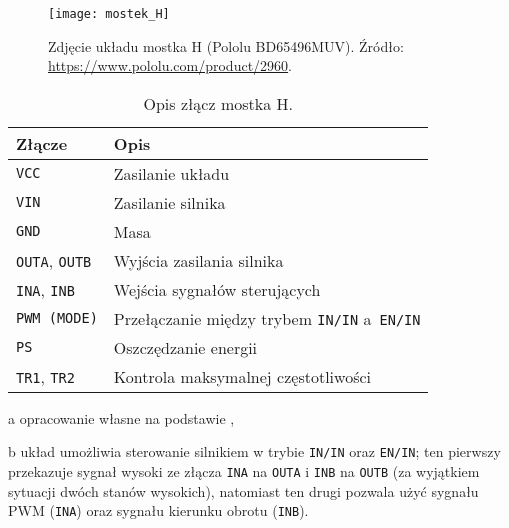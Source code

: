 \begin{figure}[H]
    \centering
    \texttt{[image: mostek\_H]}
    \caption{Zdjęcie układu mostka H (Pololu BD65496MUV). Źródło: \url{https://www.pololu.com/product/2960}.}
    \label{fig:zdjecie_mostka_H}
\end{figure}

\begin{table}[h]
    \centering
    \begin{threeparttable}
        \caption{Opis złącz mostka H.}
        \label{tab:zlacza_mostka_H}
        
        \begin{tabularx}{0.67\textwidth}{l | l}
            \toprule
            Złącze & Opis \\
            \midrule
            \texttt{VCC} & Zasilanie układu \\
            \texttt{VIN} & Zasilanie silnika \\
            \texttt{GND} & Masa \\
            \texttt{OUTA}, \texttt{OUTB} & Wyjścia zasilania silnika \\
            \texttt{INA}, \texttt{INB} & Wejścia sygnałów sterujących \\
            \texttt{PWM (MODE)} & Przełączanie między trybem \texttt{IN/IN} a~\texttt{EN/IN}\tnote{b} \\
            \texttt{PS} & Oszczędzanie energii \\
            \texttt{TR1}, \texttt{TR2} & Kontrola maksymalnej częstotliwości \\
            \bottomrule
        \end{tabularx}
        
        \begin{tablenotes}
            \footnotesize
            \item[a] opracowanie własne na podstawie \cite{MOSTEK_H_MANUAL},
            \item[b] układ umożliwia sterowanie silnikiem w trybie \texttt{IN/IN} oraz \texttt{EN/IN}; ten pierwszy przekazuje sygnał wysoki ze złącza \texttt{INA} na \texttt{OUTA} i \texttt{INB} na \texttt{OUTB} (za wyjątkiem sytuacji dwóch stanów wysokich), natomiast ten drugi pozwala użyć sygnału PWM (\texttt{INA}) oraz sygnału kierunku obrotu (\texttt{INB}).
        \end{tablenotes}
    \end{threeparttable}
\end{table}

